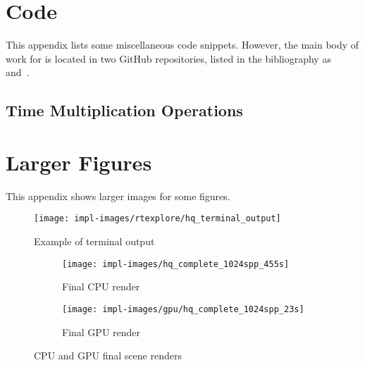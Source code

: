 %
%

\chapter{Code}\label{appendix:code}
This appendix lists some miscellaneous code snippets.
However, the main body of work for \name{} is located in two GitHub repositories, listed in the bibliography as~\cite{raytermCpuImpl} and~\cite{raytermGpuImpl}.


\section{Time Multiplication Operations}\label{appendix:timemul}


\chapter{Larger Figures}\label{appendix:large_figures}
This appendix shows larger images for some figures.

\begin{figure}[htb]
  \centering
  \texttt{[image: impl-images/rtexplore/hq\_terminal\_output]}
  \caption{Example of terminal output}
\label{fig:terminal_output_large}
\end{figure}


\vspace{0.3em}
\begin{figure}[htb]
  \centering
  \begin{subfigure}[htb]{\textwidth}
  \texttt{[image: impl-images/hq\_complete\_1024spp\_455s]}
  \caption{Final CPU render}
\label{fig:rayterm-cpu_final_render_large}
  \end{subfigure}
  \begin{subfigure}[htb]{\textwidth}
      \texttt{[image: impl-images/gpu/hq\_complete\_1024spp\_23s]}
      \caption{Final GPU render}
\label{fig:rayterm-gpu_final_render_large}
  \end{subfigure}
  \caption{CPU and GPU final scene renders}
\label{fig:rayterm_final_ppm_outputs_large}
\end{figure}

